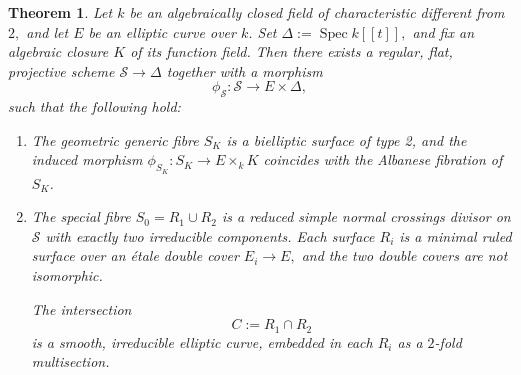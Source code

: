 \documentclass[11pt,letterpaper]{amsart}
\numberwithin{equation}{section}
\newtheorem{theorem}{Theorem}[section]
\theoremstyle{definition}
\theoremstyle{remark}
\DeclareMathOperator{\Spec}{Spec}
\begin{document}
\begin{theorem}\label{thm:degeneration_S} Let $k$ be an algebraically closed field of characteristic different from $2,$ and let $E$ be an elliptic curve over $k$. Set $\Delta:=\Spec k[[t]],$ and fix an algebraic closure $K$ of its function field. Then there exists a regular, flat, projective scheme $\mathcal{S}\to\Delta$ together with a morphism $$\phi_{\mathcal{S}}\colon\mathcal{S}\longrightarrow E\times\Delta,$$ such that the following hold:
\begin{enumerate}
    \item\label{it:generic_fibre'} The geometric generic fibre $S_{K}$ is a bielliptic surface of type 2, and the induced morphism $\phi_{S_{K}}\colon S_{K}\to E\times_{k} K$ coincides with the Albanese fibration of $S_{K}$.
    \item\label{it:special_fibre'} The special fibre $S_{0}=R_{1}\cup R_{2}$ is a reduced simple normal crossings divisor on $\mathcal{S}$ with exactly two irreducible components. Each surface $R_{i}$ is a minimal ruled surface over an \'etale double cover $E_{i}\to E,$ and the two double covers are not isomorphic.\par
    The intersection $$C:=R_{1}\cap R_{2}$$ is a smooth, irreducible elliptic curve, embedded in each $R_{i}$ as a $2$-fold multisection. 
\end{enumerate}  
\end{theorem}
\end{document}
